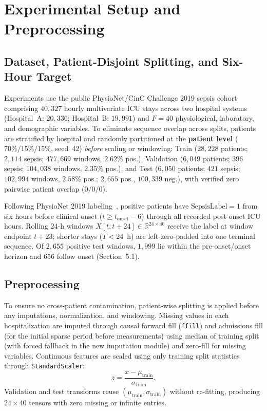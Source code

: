 \documentclass{llncs}
\begin{document}
\section{Experimental Setup and Preprocessing}

\subsection{Dataset, Patient-Disjoint Splitting, and Six-Hour Target}

Experiments use the public PhysioNet/CinC Challenge 2019 sepsis cohort~\cite{23} comprising $40{,}327$ hourly multivariate ICU stays across two hospital systems (Hospital~A: $20{,}336$; Hospital~B: $19{,}991$) and $F=40$ physiological, laboratory, and demographic variables. To eliminate sequence overlap across splits, patients are stratified by hospital and randomly partitioned at the \textbf{patient level} ($70\%/15\%/15\%$, seed~$42$) \emph{before} scaling or windowing: Train ($28{,}228$ patients; $2{,}114$ sepsis; $477{,}669$ windows, $2.62\%$ pos.), Validation ($6{,}049$ patients; $396$ sepsis; $104{,}038$ windows, $2.35\%$ pos.), and Test ($6{,}050$ patients; $421$ sepsis; $102{,}994$ windows, $2.58\%$ pos.; $2{,}655$ pos., $100{,}339$ neg.), with verified zero pairwise patient overlap ($0/0/0$).

Following PhysioNet 2019 labeling~\cite{23}, positive patients have $\mathrm{SepsisLabel}=1$ from six hours before clinical onset ($t \ge t_{\mathrm{onset}}-6$) through all recorded post-onset ICU hours. Rolling $24$-h windows $X[t:t+24]\in\mathbb{R}^{24\times 40}$ receive the label at window endpoint $t+23$; shorter stays ($T<24$~h) are left-zero-padded into one terminal sequence. Of $2{,}655$ positive test windows, $1{,}999$ lie within the pre-onset/onset horizon and $656$ follow onset (Section~5.1).

\subsection{Preprocessing}

To ensure no cross-patient contamination, patient-wise splitting is applied before any imputations, normalization, and windowing. Missing values in each hospitalization are imputed through causal forward fill (\texttt{ffill}) and admissions fill (for the initial sparse period before measurements) using median of training split (with forced fallback in the new imputation module) and zero-fill for missing variables. Continuous features are scaled using only training split statistics through \texttt{StandardScaler}:
\begin{equation}\label{eq:std}
z=\frac{x-\mu_{\mathrm{train}}}{\sigma_{\mathrm{train}}}.
\end{equation}
Validation and test transforms reuse $(\mu_{\mathrm{train}},\sigma_{\mathrm{train}})$ without re-fitting, producing $24\times 40$ tensors with zero missing or infinite entries.
\end{document}
